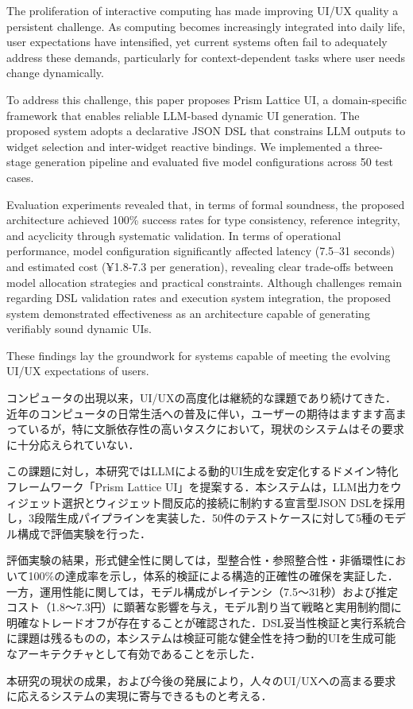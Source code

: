 \documentclass[senior,final,11pt,dvipdfmx]{iputit-thesis}
\date{December 15, 2025}
\begin{document}
\begin{eabstract}
The proliferation of interactive computing has made improving UI/UX quality a persistent challenge. As computing becomes increasingly integrated into daily life, user expectations have intensified, yet current systems often fail to adequately address these demands, particularly for context-dependent tasks where user needs change dynamically.

To address this challenge, this paper proposes Prism Lattice UI, a domain-specific framework that enables reliable LLM-based dynamic UI generation. The proposed system adopts a declarative JSON DSL that constrains LLM outputs to widget selection and inter-widget reactive bindings. We implemented a three-stage generation pipeline and evaluated five model configurations across 50 test cases.

Evaluation experiments revealed that, in terms of formal soundness, the proposed architecture achieved 100\% success rates for type consistency, reference integrity, and acyclicity through systematic validation. In terms of operational performance, model configuration significantly affected latency (7.5–31 seconds) and estimated cost (¥1.8-7.3 per generation), revealing clear trade-offs between model allocation strategies and practical constraints. Although challenges remain regarding DSL validation rates and execution system integration, the proposed system demonstrated effectiveness as an architecture capable of generating verifiably sound dynamic UIs.

These findings lay the groundwork for systems capable of meeting the evolving UI/UX expectations of users.
\end{eabstract}

\begin{jabstract}
コンピュータの出現以来，UI/UXの高度化は継続的な課題であり続けてきた．近年のコンピュータの日常生活への普及に伴い，ユーザーの期待はますます高まっているが，特に文脈依存性の高いタスクにおいて，現状のシステムはその要求に十分応えられていない．

この課題に対し，本研究ではLLMによる動的UI生成を安定化するドメイン特化フレームワーク「Prism Lattice UI」を提案する．本システムは，LLM出力をウィジェット選択とウィジェット間反応的接続に制約する宣言型JSON DSLを採用し，3段階生成パイプラインを実装した．50件のテストケースに対して5種のモデル構成で評価実験を行った．

評価実験の結果，形式健全性に関しては，型整合性・参照整合性・非循環性において100\%の達成率を示し，体系的検証による構造的正確性の確保を実証した．一方，運用性能に関しては，モデル構成がレイテンシ（7.5〜31秒）および推定コスト（1.8〜7.3円）に顕著な影響を与え，モデル割り当て戦略と実用制約間に明確なトレードオフが存在することが確認された．DSL妥当性検証と実行系統合に課題は残るものの，本システムは検証可能な健全性を持つ動的UIを生成可能なアーキテクチャとして有効であることを示した．

本研究の現状の成果，および今後の発展により，人々のUI/UXへの高まる要求に応えるシステムの実現に寄与できるものと考える．
\end{jabstract}
\end{document}

